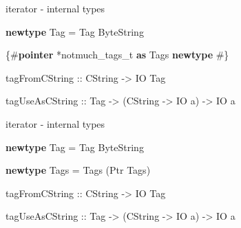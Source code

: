\documentclass[ignorenonframetext,aspectratio=169]{beamer}
\newenvironment{Shaded}{}{}
\newcommand{\KeywordTok}[1]{\textcolor[rgb]{0.00,0.44,0.13}{\textbf{{#1}}}}
\newcommand{\DataTypeTok}[1]{\textcolor[rgb]{0.56,0.13,0.00}{{#1}}}
\newcommand{\StringTok}[1]{\textcolor[rgb]{0.25,0.44,0.63}{{#1}}}
\newcommand{\OtherTok}[1]{\textcolor[rgb]{0.00,0.44,0.13}{{#1}}}
\newcommand{\FunctionTok}[1]{\textcolor[rgb]{0.02,0.16,0.49}{{#1}}}
\newcommand{\NormalTok}[1]{{#1}}
\begin{document}
\begin{frame}[fragile]{iterator - internal types}

\begin{Shaded}
\begin{Highlighting}[]
\KeywordTok{newtype} \DataTypeTok{Tag} \FunctionTok{=} \DataTypeTok{Tag} \DataTypeTok{ByteString}

\StringTok{\{#}\KeywordTok{pointer}\StringTok{ *notmuch_tags_t }\KeywordTok{as}\StringTok{ }\DataTypeTok{Tags}\StringTok{ }\KeywordTok{newtype}\StringTok{ #\}}

\OtherTok{tagFromCString ::} \DataTypeTok{CString} \OtherTok{->} \DataTypeTok{IO} \DataTypeTok{Tag}

\OtherTok{tagUseAsCString ::} \DataTypeTok{Tag} \OtherTok{->} \NormalTok{(}\DataTypeTok{CString} \OtherTok{->} \DataTypeTok{IO} \NormalTok{a) }\OtherTok{->} \DataTypeTok{IO} \NormalTok{a}
\end{Highlighting}
\end{Shaded}

\end{frame}

\begin{frame}[fragile]{iterator - internal types}

\begin{Shaded}
\begin{Highlighting}[]
\KeywordTok{newtype} \DataTypeTok{Tag} \FunctionTok{=} \DataTypeTok{Tag} \DataTypeTok{ByteString}

\KeywordTok{newtype} \DataTypeTok{Tags} \FunctionTok{=} \DataTypeTok{Tags} \NormalTok{(}\DataTypeTok{Ptr} \DataTypeTok{Tags}\NormalTok{)}

\OtherTok{tagFromCString ::} \DataTypeTok{CString} \OtherTok{->} \DataTypeTok{IO} \DataTypeTok{Tag}

\OtherTok{tagUseAsCString ::} \DataTypeTok{Tag} \OtherTok{->} \NormalTok{(}\DataTypeTok{CString} \OtherTok{->} \DataTypeTok{IO} \NormalTok{a) }\OtherTok{->} \DataTypeTok{IO} \NormalTok{a}
\end{Highlighting}
\end{Shaded}

\end{frame}
\end{document}
